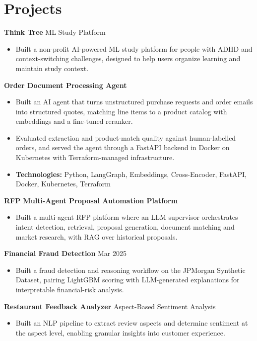 \documentclass[10pt,a4paper]{article}
\begin{document}
\section{Projects}
\textbf{Think Tree} \textbar{} ML Study Platform\par
\begin{itemize}
  \item Built a non-profit AI-powered ML study platform for people with ADHD and context-switching challenges, designed to help users organize learning and maintain study context.
\end{itemize}
\textbf{Order Document Processing Agent}\par
\begin{itemize}
  \item Built an AI agent that turns unstructured purchase requests and order emails into structured quotes, matching line items to a product catalog with embeddings and a fine-tuned reranker.
  \item Evaluated extraction and product-match quality against human-labelled orders, and served the agent through a FastAPI backend in Docker on Kubernetes with Terraform-managed infrastructure.
  \item \textbf{Technologies:} Python, LangGraph, Embeddings, Cross-Encoder, FastAPI, Docker, Kubernetes, Terraform
\end{itemize}
\textbf{RFP Multi-Agent Proposal Automation Platform}\par
\begin{itemize}
  \item Built a multi-agent RFP platform where an LLM supervisor orchestrates intent detection, retrieval, proposal generation, document matching and market research, with RAG over historical proposals.
\end{itemize}
\textbf{Financial Fraud Detection} \textbar{} Mar 2025\par
\begin{itemize}
  \item Built a fraud detection and reasoning workflow on the JPMorgan Synthetic Dataset, pairing LightGBM scoring with LLM-generated explanations for interpretable financial-risk analysis.
\end{itemize}
\textbf{Restaurant Feedback Analyzer} \textbar{} Aspect-Based Sentiment Analysis\par
\begin{itemize}
  \item Built an NLP pipeline to extract review aspects and determine sentiment at the aspect level, enabling granular insights into customer experience.
\end{itemize}
\end{document}
